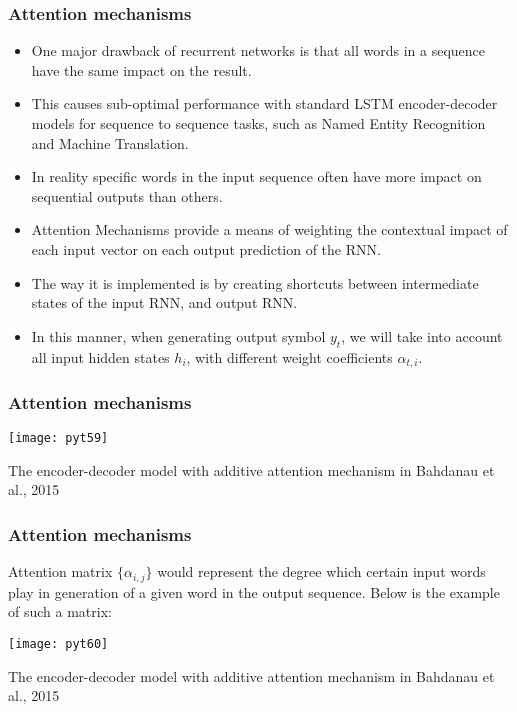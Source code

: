 \begin{frame}[fragile] \frametitle{Attention mechanisms}


\begin{itemize}
\item One major drawback of recurrent networks is that all words in a sequence have the same impact on the result. 
\item This causes sub-optimal performance with standard LSTM encoder-decoder models for sequence to sequence tasks, such as Named Entity Recognition and Machine Translation. 
\item In reality specific words in the input sequence often have more impact on sequential outputs than others.
\item Attention Mechanisms provide a means of weighting the contextual impact of each input vector on each output prediction of the RNN. 
\item The way it is implemented is by creating shortcuts between intermediate states of the input RNN, and output RNN. 
\item In this manner, when generating output symbol $y_t$, we will take into account all input hidden states $h_i$, with different weight coefficients $\alpha_{t,i}$. 

\end{itemize}
\end{frame}

\begin{frame}[fragile] \frametitle{Attention mechanisms}

\begin{center}
\texttt{[image: pyt59]}
\end{center}

{\tiny The encoder-decoder model with additive attention mechanism in Bahdanau et al., 2015}
\end{frame}

\begin{frame}[fragile] \frametitle{Attention mechanisms}

Attention matrix $\{\alpha_{i,j}\}$ would represent the degree which certain input words play in generation of a given word in the output sequence. Below is the example of such a matrix:


\begin{center}
\texttt{[image: pyt60]}
\end{center}

{\tiny The encoder-decoder model with additive attention mechanism in Bahdanau et al., 2015}
\end{frame}

